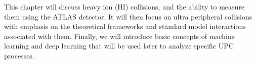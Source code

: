 This chapter will discuss heavy ion (HI) collisions, and the ability to measure them using the ATLAS detector. It will then focus on ultra peripheral collisions with emphasis on the theoretical frameworks and standard model interactions associated with them. Finally, we will introduce basic concepts of machine learning and deep learning that will be used later to analyze specific UPC processes.
